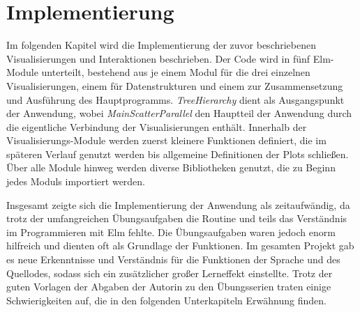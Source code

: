 \documentclass[usegeometry=true]{scrartcl}
\begin{document}
\section{Implementierung}
Im folgenden Kapitel wird die Implementierung der zuvor beschriebenen Visualisierungen und Interaktionen beschrieben. 
Der Code wird in fünf Elm-Module unterteilt, bestehend aus je einem Modul für die drei einzelnen Visualisierungen, einem für Datenstrukturen und einem zur Zusammensetzung und Ausführung des Hauptprogramms. 
\textit{TreeHierarchy} dient als Ausgangspunkt der Anwendung, wobei \textit{MainScatterParallel} den Hauptteil der Anwendung durch die eigentliche Verbindung der Visualisierungen enthält.
Innerhalb der Visualisierungs-Module werden zuerst kleinere Funktionen definiert, die im späteren Verlauf genutzt werden bis allgemeine Definitionen der Plots schließen. 
Über alle Module hinweg werden diverse Bibliotheken genutzt, die zu Beginn jedes Moduls importiert werden.  
           
Insgesamt zeigte sich die Implementierung der Anwendung als zeitaufwändig, da trotz der umfangreichen Übungsaufgaben die Routine und teils das Verständnis im Programmieren mit Elm fehlte.
Die Übungsaufgaben waren jedoch enorm hilfreich und dienten oft als Grundlage der Funktionen.
Im gesamten Projekt gab es neue Erkenntnisse und Verständnis für die Funktionen der Sprache und des Quellodes, sodass sich ein zusätzlicher großer Lerneffekt einstellte.
Trotz der guten Vorlagen der Abgaben der Autorin zu den Übungsserien traten einige Schwierigkeiten auf, die in den folgenden Unterkapiteln Erwähnung finden.
          
\end{document}
